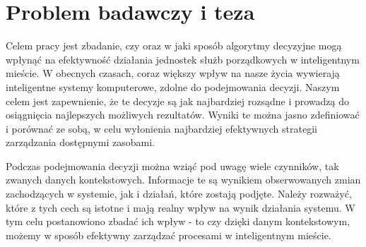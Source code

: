 \section{Problem badawczy i teza}

\par Celem pracy jest zbadanie, czy oraz w jaki sposób algorytmy decyzyjne mogą wpłynąć na efektywność działania jednostek służb porządkowych w inteligentnym mieście. W obecnych czasach, coraz większy wpływ na nasze życia wywierają inteligentne systemy komputerowe, zdolne do podejmowania decyzji. Naszym celem jest zapewnienie, że te decyzje są jak najbardziej rozsądne i prowadzą do osiągnięcia najlepszych możliwych rezultatów. Wyniki te można jasno zdefiniować i porównać ze sobą, w celu wyłonienia najbardziej efektywnych strategii zarządzania dostępnymi zasobami.


\par Podczas podejmowania decyzji można wziąć pod uwagę wiele czynników, tak zwanych danych kontekstowych. Informacje te są wynikiem obserwowanych zmian zachodzących w systemie, jak i działań, które zostają podjęte. Należy rozważyć, które z tych cech są istotne i mają realny wpływ na wynik działania systemu. W tym celu postanowiono zbadać ich wpływ - to czy dzięki danym kontekstowym, możemy w sposób efektywny zarządzać procesami w inteligentnym mieście.